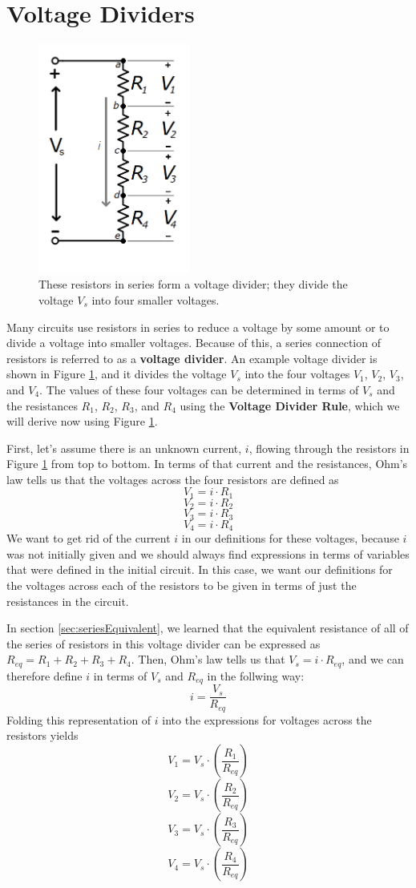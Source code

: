 \section{Voltage Dividers}
\label{sec:voltageDividers}
\begin{figure}[h!]
\centering
\includegraphics[width=5cm]{figures/voltageDivider.png}
\caption{These resistors in series form a voltage divider; they divide the voltage $V_s$ into four smaller voltages.}
\label{voltageDivider}
\end{figure}
Many circuits use resistors in series to reduce a voltage by some amount or to divide a voltage into smaller voltages. Because of this, a series connection of resistors is referred to as a \textbf{voltage divider}. An example voltage divider is shown in Figure \ref{voltageDivider}, and it divides the voltage $V_s$ into the four voltages $V_1$, $V_2$, $V_3$, and $V_4$. The values of these four voltages can be determined in terms of $V_s$ and the resistances $R_1$, $R_2$, $R_3$, and $R_4$ using the \textbf{Voltage Divider Rule}, which we will derive now using Figure \ref{voltageDivider}.
\par
First, let's assume there is an unknown current, $i$, flowing through the resistors in Figure \ref{voltageDivider} from top to bottom. In terms of that current and the resistances, Ohm's law tells us that the voltages across the four resistors are defined as 
$$
V_1 = i \cdot R_1
$$
$$
V_2 = i \cdot R_2
$$
$$
V_3 = i \cdot R_3
$$
$$
V_4 = i \cdot R_4
$$
We want to get rid of the current $i$ in our definitions for these voltages, because $i$ was not initially given and we should always find expressions in terms of variables that were defined in the initial circuit. In this case, we want our definitions for the voltages across each of the resistors to be given in terms of just the resistances in the circuit.
\par
In section \ref{sec:seriesEquivalent}, we learned that the equivalent resistance of all of the series of resistors in this voltage divider can be expressed as $R_{eq}=R_1 + R_2 + R_3 + R_4$. Then, Ohm's law tells us that $V_s = i \cdot R_{eq}$, and we can therefore define $i$ in terms of $V_s$ and $R_{eq}$ in the follwing way: 
$$
i=\frac{V_s}{R_{eq}}
$$
Folding this representation of $i$ into the expressions for voltages across the resistors yields
$$
V_1 = V_s \cdot \left(\frac{R_1}{R_{eq}}\right)
$$
$$
V_2 = V_s \cdot \left(\frac{R_2}{R_{eq}}\right) 
$$
$$
V_3 = V_s \cdot \left(\frac{R_3}{R_{eq}}\right)
$$
$$
V_4 = V_s \cdot \left(\frac{R_4}{R_{eq}}\right)
$$

